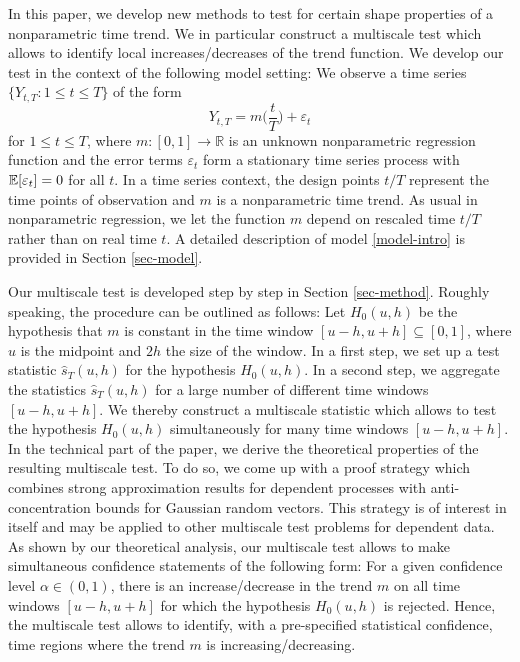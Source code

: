 In this paper, we develop new methods to test for certain shape properties of a nonparametric time trend. We in particular construct a multiscale test which allows to identify local increases/decreases of the trend function. 
We develop our test in the context of the following model setting: We observe a time series $\{ Y_{t,T}: 1 \le t \le T \}$ of the form 
\begin{equation}\label{model-intro}
Y_{t,T} = m \Big( \frac{t}{T} \Big) + \varepsilon_t
\end{equation}
for $1 \le t \le T$, where $m: [0,1] \rightarrow \mathbb{R}$ is an unknown nonparametric regression function and the error terms $\varepsilon_t$ form a stationary time series process with $\mathbb{E}[\varepsilon_t] = 0$ for all $t$. In a time series context, the design points $t/T$ represent the time points of observation and $m$ is a nonparametric time trend. As usual in nonparametric regression, we let the function $m$ depend on rescaled time $t/T$ rather than on real time $t$. A detailed description of model \eqref{model-intro} is provided in Section \ref{sec-model}.


Our multiscale test is developed step by step in Section \ref{sec-method}. Roughly speaking, the procedure can be outlined as follows: Let $H_0(u,h)$ be the hypothesis that $m$ is constant in the time window $[u-h,u+h] \subseteq [0,1]$, where $u$ is the midpoint and $2h$ the size of the window. In a first step, we set up a test statistic $\widehat{s}_T(u,h)$ for the hypothesis $H_0(u,h)$. In a second step, we aggregate the statistics $\widehat{s}_T(u,h)$ for a large number of different time windows $[u-h,u+h]$. We thereby construct a multiscale statistic which allows to test the hypothesis $H_0(u,h)$ simultaneously for many time windows $[u-h,u+h]$. In the technical part of the paper, we derive the theoretical properties of the resulting multiscale test. To do so, we come up with a proof strategy which combines strong approximation results for dependent processes with anti-concentration bounds for Gaussian random vectors. This strategy is of interest in itself and may be applied to other multiscale test problems for dependent data. As shown by our theoretical analysis, our multiscale test allows to make simultaneous confidence statements of the following form: For a given confidence level $\alpha \in (0,1)$, there is an increase/decrease in the trend $m$ on all time windows $[u-h,u+h]$ for which the hypothesis $H_0(u,h)$ is rejected. Hence, the multiscale test allows to identify, with a pre-specified statistical confidence, time regions where the trend $m$ is increasing/decreasing. 


